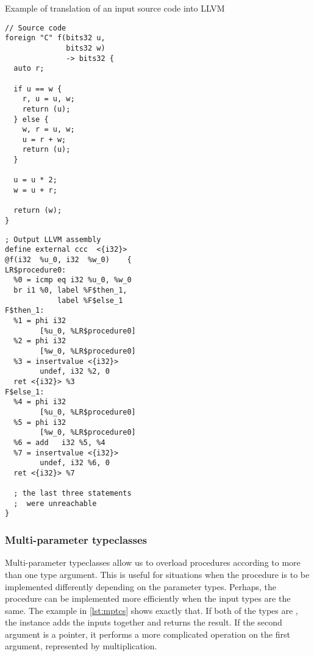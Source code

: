 \begin{codex}
    \small
    \caption{Example of translation of an input source code into LLVM}
    \label{lst:translex}
    \begin{center}
    \begin{minipage}{0.5\linewidth}
    \begin{lstlisting}
// Source code
foreign "C" f(bits32 u,
              bits32 w)
              -> bits32 {
  auto r;

  if u == w {
    r, u = u, w;
    return (u);
  } else {
    w, r = u, w;
    u = r + w;
    return (u);
  }

  u = u * 2;
  w = u + r;

  return (w);
}
    \end{lstlisting}
    \end{minipage}%
    \begin{minipage}{0.5\linewidth}
    \begin{lstlisting}[style=llvmStyle]
; Output LLVM assembly
define external ccc  <{i32}>
@f(i32  %u_0, i32  %w_0)    {
LR$procedure0:
  %0 = icmp eq i32 %u_0, %w_0
  br i1 %0, label %F$then_1,
            label %F$else_1
F$then_1:
  %1 = phi i32
        [%u_0, %LR$procedure0]
  %2 = phi i32
        [%w_0, %LR$procedure0]
  %3 = insertvalue <{i32}>
        undef, i32 %2, 0
  ret <{i32}> %3
F$else_1:
  %4 = phi i32
        [%u_0, %LR$procedure0]
  %5 = phi i32
        [%w_0, %LR$procedure0]
  %6 = add   i32 %5, %4
  %7 = insertvalue <{i32}>
        undef, i32 %6, 0
  ret <{i32}> %7

  ; the last three statements
  ;  were unreachable
}
    \end{lstlisting}
    \end{minipage}
    \end{center}
\end{codex}

\subsubsection{Multi-parameter typeclasses}
\label{sec:mptcs}

Multi-parameter typeclasses allow us to overload procedures according to more than one type argument. This is useful for situations when the procedure is to be implemented differently depending on the parameter types. Perhaps, the procedure can be implemented more efficiently when the input types are the same. The example in \cref{lst:mptcs} shows exactly that. If both of the types are , the instance adds the inputs together and returns the result. If the second argument is a pointer, it performs a more complicated operation on the first argument, represented by multiplication.

